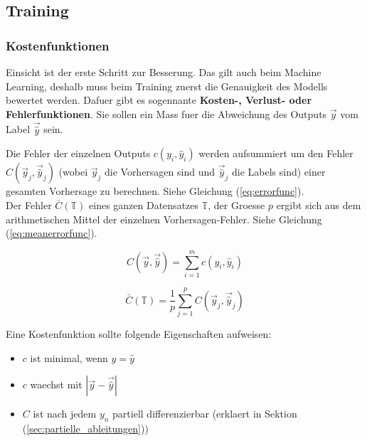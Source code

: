\documentclass[../main]{subfiles}
\begin{document}
\subsection{Training}
\subsubsection{Kostenfunktionen}
Einsicht ist der erste Schritt zur Besserung. Das gilt auch beim Machine Learning, deshalb muss beim Training zuerst die Genauigkeit des Modells bewertet werden.
Dafuer gibt es sogennante \textbf{Kosten-, Verlust- oder Fehlerfunktionen}. Sie sollen ein Mass fuer die Abweichung des Outputs $\vec{y}$ vom Label $\vec{\hat{y}}$ sein.
\par\medskip
Die Fehler der einzelnen Outputs $c(y_i,\hat{y}_i)$ werden aufsummiert um den
Fehler $C(\vec{y}_j,\vec{\hat{y}}_j)$ (wobei $\vec{y}_j$ die Vorhersagen sind und
$\vec{\hat{y}}_j$ die Labels sind) einer gesamten Vorhersage zu berechnen. Siehe Gleichung (\ref{eq:errorfunc}).\\
Der Fehler $\bar{C}(\mathbb{T})$ eines ganzen Datensatzes $\mathbb{T}$, der
Groesse $p$ ergibt sich aus dem arithmetischen
Mittel der einzelnen Vorhersagen-Fehler. Siehe Gleichung (\ref{eq:meanerrorfunc}).
\par\medskip
\begin{minipage}[h!]{0.5\textwidth}
  \centering
  \begin{equation}\label{eq:errorfunc}
    C \left(\vec{y},\vec{\hat{y}} \right)=\displaystyle\sum_{i=1}^{m} c(y_i, \hat{y}_i)
  \end{equation}
\end{minipage}
\begin{minipage}[h!]{0.5\textwidth}
  \centering
  \begin{equation}\label{eq:meanerrorfunc}
    \bar{C}(\mathbb{T}) = \frac{1}{p}\displaystyle\sum_{j=1}^{p} C\left(\vec{y}_j,\vec{\hat{y}}_j\right)
  \end{equation}
\end{minipage}
\par\medskip
Eine Kostenfunktion sollte folgende Eigenschaften aufweisen:
\begin{itemize}
\item{$c$ ist minimal, wenn $y = \hat{y}$}
\item{$c$ waechst mit $|\vec{y}-\vec{\hat{y}}|$}
\item{$C$ ist nach jedem $y_n$ partiell differenzierbar (erklaert in Sektion (\ref{sec:partielle_ableitungen}))}
\end{itemize}
\end{document}
